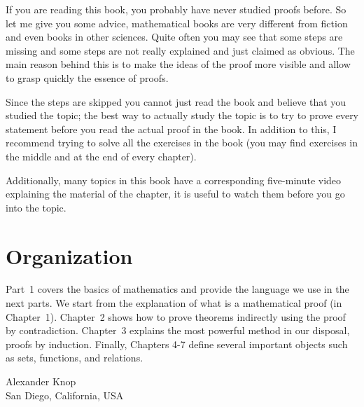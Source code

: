 If you are reading this book, you probably have never studied proofs before. So let me give you some advice, mathematical books are very different from fiction and even books in other sciences. Quite often you may see that some steps are missing and some steps are not really explained and just claimed as obvious.  The main reason behind this is to make the ideas of the proof more visible and allow to grasp quickly the essence of proofs.

Since the steps are skipped you cannot just read the book and believe that you studied the topic;  the best way to actually study the topic is to try to prove every statement before you read the actual proof in the book. In addition to this, I recommend trying to solve all the exercises in the book (you may find exercises in the middle and at the end of every chapter).

Additionally, many topics in this book have a corresponding five-minute video explaining the material of the chapter, it is useful to watch them before you go into the topic.

\section*{Organization}
Part~1 covers the basics of mathematics and provide the language we use in the
next parts. We start from the explanation of what is a mathematical proof (in Chapter~1). Chapter~2 shows how to prove theorems indirectly using the proof by contradiction. Chapter~3 explains the most powerful method in our disposal, proofs by induction. Finally, Chapters 4-7 define several important objects such as sets, functions, and relations.

\begin{flushright}
  Alexander Knop \\
  San Diego, California, USA
\end{flushright}
